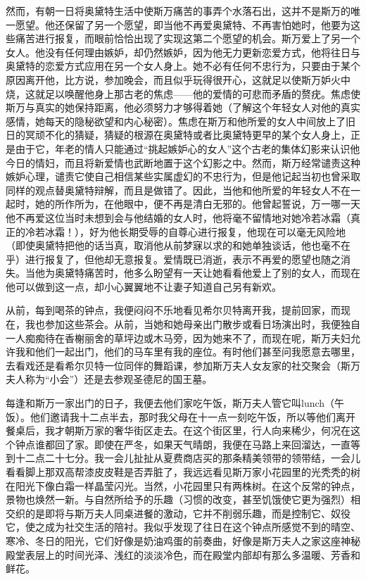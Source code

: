 \par 然而，有朝一日将奥黛特生活中使斯万痛苦的事弄个水落石出，这并不是斯万的唯一愿望。他还保留了另一个愿望，即当他不再爱奥黛特、不再害怕她时，他要为这些痛苦进行报复，而眼前恰恰出现了实现这第二个愿望的机会。斯万爱上了另一个女人。他没有任何理由嫉妒，却仍然嫉妒，因为他无力更新恋爱方式，他将往日与奥黛特的恋爱方式应用在另一个女人身上。她不必有任何不忠行为，只要由于某个原因离开他，比方说，参加晚会，而且似乎玩得很开心，这就足以使斯万妒火中烧，这就足以唤醒他身上那古老的焦虑——他的爱情的可悲而矛盾的赘疣。焦虑使斯万与真实的她保持距离，他必须努力才够得着她（了解这个年轻女人对他的真实感情，她每天的隐秘欲望和内心秘密）。焦虑在斯万和他所爱的女人中间放上了旧日的冥顽不化的猜疑，猜疑的根源在奥黛特或者比奥黛特更早的某个女人身上，正是由于它，年老的情人只能通过“挑起嫉妒心的女人”这个古老的集体幻影来认识他今日的情妇，而且将新爱情也武断地置于这个幻影之中。然而，斯万经常谴责这种嫉妒心理，谴责它使自己相信某些实属虚幻的不忠行为，但是他记起当初也曾采取同样的观点替奥黛特辩解，而且是做错了。因此，当他和他所爱的年轻女人不在一起时，她的所作所为，在他眼中，便不再是清白无邪的。他曾起誓说，万一哪一天他不再爱这位当时未想到会与他结婚的女人时，他将毫不留情地对她冷若冰霜（真正的冷若冰霜！），好为他长期受辱的自尊心进行报复，他现在可以毫无风险地（即使奥黛特把他的话当真，取消他从前梦寐以求的和她单独谈话，他也毫不在乎）进行报复了，但他却无意报复。爱情既已消逝，表示不再爱的愿望也随之消失。当他为奥黛特痛苦时，他多么盼望有一天让她看看他爱上了别的女人，而现在他可以做到这一点，却小心翼翼地不让妻子知道自己另有新欢。
\par 从前，每到喝茶的钟点，我便闷闷不乐地看见希尔贝特离开我，提前回家，而现在，我也参加这些茶会。从前，当她和她母亲出门散步或看日场演出时，我便独自一人痴痴待在香榭丽舍的草坪边或木马旁，因为她来不了，而现在呢，斯万夫妇允许我和他们一起出门，他们的马车里有我的座位。有时他们甚至问我愿意去哪里，去看戏还是看希尔贝特一位同伴的舞蹈课，参加斯万夫人女友家的社交聚会（斯万夫人称为“小会”）还是去参观圣德尼的国王墓。
\par 每逢和斯万一家出门的日子，我便去他们家吃午饭，斯万夫人管它叫lunch（午饭）。他们邀请我十二点半去，那时我父母在十一点一刻吃午饭，所以等他们离开餐桌后，我才朝斯万家的奢华街区走去。在这个街区里，行人向来稀少，何况在这个钟点谁都回了家。即使在严冬，如果天气晴朗，我便在马路上来回溜达，一直等到十二点二十七分。我一会儿扯扯从夏费商店买的那条精美领带的领带结，一会儿看看脚上那双高帮漆皮皮鞋是否弄脏了，我远远看见斯万家小花园里的光秃秃的树在阳光下像白霜一样晶莹闪光。当然，小花园里只有两株树。在这个反常的钟点，景物也焕然一新。与自然所给予的乐趣（习惯的改变，甚至饥饿使它更为强烈）相交织的是即将与斯万夫人同桌进餐的激动，它并不削弱乐趣，而是控制它、奴役它，使之成为社交生活的陪衬。我似乎发现了往日在这个钟点所感觉不到的晴空、寒冷、冬日的阳光，它们好像是奶油鸡蛋的前奏曲，好像是斯万夫人之家这座神秘殿堂表层上的时间光泽、浅红的淡淡冷色，而在殿堂内部却有那么多温暖、芳香和鲜花。
